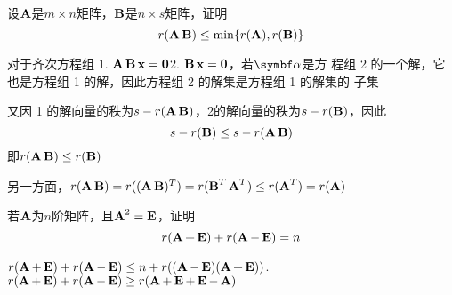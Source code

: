 \documentclass{article}
\begin{document}
\begin{examplle}[]
设\(\bA\)是\(m\times n\)矩阵，\(\bB\)是\(n\times s\)矩阵，证明
\begin{equation*}
r(\bA\bB)\le\min\{r(\bA),r(\bB)\}
\end{equation*}

对于齐次方程组 1. \(\bA\bB\bx=\bzero\)2. \(\bB\bx=\bzero\)，若\(\balpha\)是方
程组 2 的一个解，它也是方程组 1 的解，因此方程组 2 的解集是方程组 1 的解集的
子集

又因 1 的解向量的秩为\(s-r(\bA\bB)\)，2的解向量的秩为\(s-r(\bB)\)，因此
\begin{equation*}
s-r(\bB)\le s-r(\bA\bB)
\end{equation*}
即\(r(\bA\bB)\le r(\bB)\)

另一方面，\(r(\bA\bB)=r((\bA\bB)^T)=r(\bB^T\bA^T)\le r(\bA^T)=r(\bA)\)
\end{examplle}

\begin{examplle}[]
若\(\bA\)为\(n\)阶矩阵，且\(\bA^2=\bE\)，证明
\begin{equation*}
r(\bA+\bE)+r(\bA-\bE)=n
\end{equation*}

\(r(\bA+\bE)+r(\bA-\bE)\le n+r((\bA-\bE)(\bA+\bE))\).
\(r(\bA+\bE)+r(\bA-\bE)\ge r(\bA+\bE+\bE-\bA)\)
\end{examplle}
\end{document}
